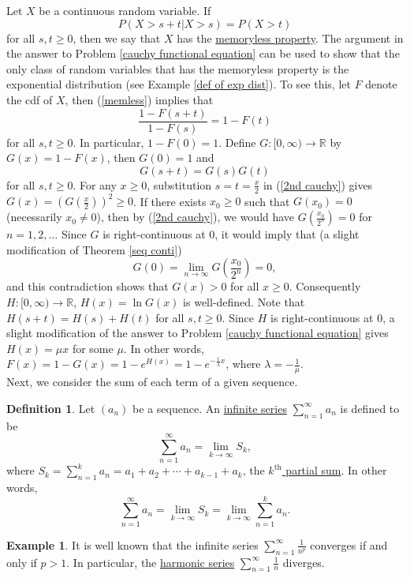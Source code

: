 \documentclass[12pt,letterpaper]{book}
\numberwithin{equation}{section}
\theoremstyle{definition}
\newtheorem{defi}[thm]{\textbf{Definition}}
\newtheorem{example}[thm]{\textbf{Example}}
\begin{document}
Let $X$ be a continuous random variable. If
\begin{equation}\label{memless} P(X>s+t|X>s)=P(X>t)\end{equation} for all $s,t\geq 0$, then we say that $X$ has the \underline{memoryless property}. The argument in the answer to Problem \ref{cauchy functional equation} can be used to show that the only class of random variables that has the memoryless property is the exponential distribution (see Example \ref{def of exp dist}). To see this, let  $F$ denote the cdf of $X$, then (\ref{memless}) implies that $$\frac{1-F(s+t)}{1-F(s)}=1-F(t)$$ for all $s,t\geq 0$. In particular, $1-F(0)=1$. Define $G:[0,\infty)\to \mathbb{R}$ by $G(x)=1-F(x)$, then $G(0)=1$ and
\begin{equation}\label{2nd cauchy} G(s+t)=G(s)G(t)\end{equation} for all $s,t\geq 0$. For any $x\geq 0$, substitution $s=t=\frac{x}{2}$ in (\ref{2nd cauchy}) gives $G(x)=(G(\frac{x}{2}))^2\geq 0$. If there exists $x_0\geq 0$ such that $G(x_0)=0$ (necessarily $x_0\neq 0$), then by (\ref{2nd cauchy}), we would have $G(\frac{x_0}{2^n})=0$ for $n=1,2,\ldots$ Since $G$ is right-continuous at $0$, it would imply that (a slight modification of Theorem \ref{seq conti})
$$G(0)=\lim_{n\to \infty}G\left(\frac{x_0}{2^n}\right)=0,$$  and this contradiction shows that $G(x)>0$ for all $x\geq 0$. Consequently $H:[0,\infty)\to \mathbb{R}$, $H(x)=\ln G(x)$ is well-defined. Note that $H(s+t)=H(s)+H(t)$ for all $s,t\geq 0$. Since $H$ is right-continuous at $0$, a slight modification of the answer to Problem \ref{cauchy functional equation} gives $H(x)=\mu x$ for some $\mu$. In other words, $F(x)=1-G(x)=1-e^{H(x)}=1-e^{-\frac{1}{\lambda} x}$, where $\lambda=-\frac{1}{\mu}$.\\

Next, we consider the sum of each term of a given sequence.

\begin{defi} Let $(a_n)$ be a sequence.  An \underline{infinite series} $\displaystyle{\sum_{n=1}^\infty a_n}$ is defined to be
$$\sum_{n=1}^\infty a_n=\lim_{k\to \infty}S_k,$$
where $\displaystyle{S_k=\sum_{n=1}^k a_n = a_1+a_2+\cdots+a_{k-1}+a_k}$, the \underline{$k^{\text{th}}$ partial sum}.  In other words,
$$\sum_{n=1}^\infty a_n=\lim_{k\to \infty}S_k=\lim_{k\to \infty} \sum_{n=1}^k a_n.$$
\end{defi}

\begin{example}
It is well known that the infinite series $\displaystyle{\sum_{n=1}^\infty \frac{1}{n^p}}$ converges if and only if $p>1$. In particular, the \underline{harmonic series} $\displaystyle{\sum_{n=1}^\infty \frac{1}{n}}$ diverges.
\end{example}
\end{document}
